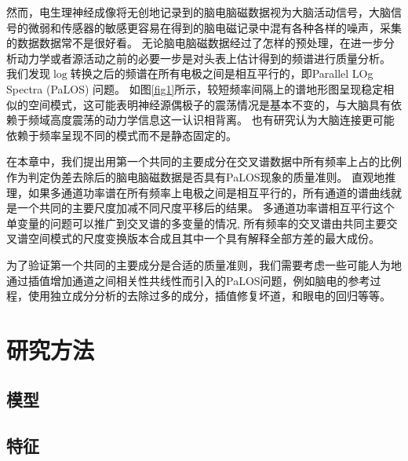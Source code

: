 然而，电生理神经成像将无创地记录到的脑电脑磁数据视为大脑活动信号，大脑信号的微弱和传感器的敏感更容易在得到的脑电磁记录中混有各种各样的噪声，采集的数据数据常不是很好看。 无论脑电脑磁数据经过了怎样的预处理，在进一步分析动力学或者源活动之前的必要一步是对头表上估计得到的频谱进行质量分析。 我们发现$\log$转换之后的频谱在所有电极之间是相互平行的，即Parallel LOg Spectra (PaLOS) 问题。 如图\ref{fig1}所示，较短频率间隔上的谱地形图呈现稳定相似的空间模式，这可能表明神经源偶极子的震荡情况是基本不变的，与大脑具有依赖于频域高度震荡的动力学信息这一认识相背离。 也有研究认为大脑连接更可能依赖于频率呈现不同的模式而不是静态固定的。

在本章中，我们提出用第一个共同的主要成分在交叉谱数据中所有频率上占的比例作为判定伪差去除后的脑电脑磁数据是否具有PaLOS现象的质量准则。 直观地推理，如果多通道功率谱在所有频率上电极之间是相互平行的，所有通道的谱曲线就是一个共同的主要尺度加减不同尺度平移后的结果。 多通道功率谱相互平行这个单变量的问题可以推广到交叉谱的多变量的情况, 所有频率的交叉谱由共同主要交叉谱空间模式的尺度变换版本合成且其中一个具有解释全部方差的最大成份。


为了验证第一个共同的主要成分是合适的质量准则，我们需要考虑一些可能人为地通过插值增加通道之间相关性共线性而引入的PaLOS问题，例如脑电的参考过程，使用独立成分分析的去除过多的成分，插值修复坏道，和眼电的回归等等。 

\section{研究方法}
\subsection{模型}

\subsection{特征}
